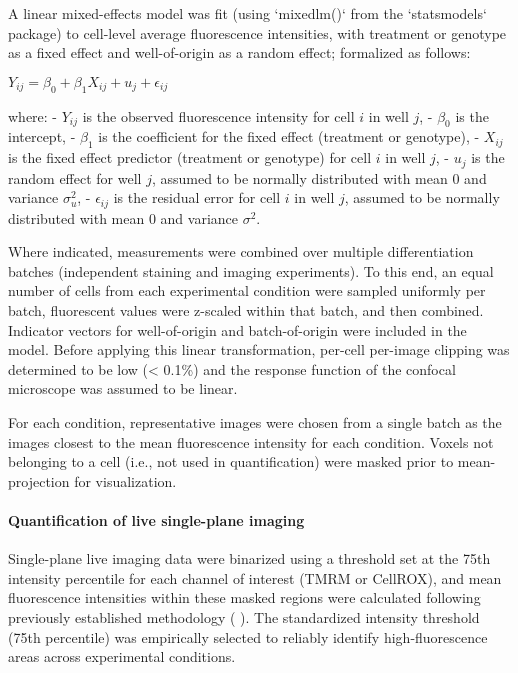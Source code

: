 A linear mixed-effects model was fit (using `mixedlm()` from the `statsmodels` package) to cell-level average fluorescence intensities, with treatment or genotype as a fixed effect and well-of-origin as a random effect; formalized as follows:

$ Y_{ij} = \beta_0 + \beta_1 X_{ij} + u_j + \epsilon_{ij} $

where:
- $Y_{ij}$ is the observed fluorescence intensity for cell $i$ in well $j$,
- $\beta_0$ is the intercept,
- $\beta_1$ is the coefficient for the fixed effect (treatment or genotype),
- $X_{ij}$ is the fixed effect predictor (treatment or genotype) for cell $i$ in well $j$,
- $u_j$ is the random effect for well $j$, assumed to be normally distributed with mean 0 and variance $\sigma_u^2$,
- $\epsilon_{ij}$ is the residual error for cell $i$ in well $j$, assumed to be normally distributed with mean 0 and variance $\sigma^2$.

Where indicated, measurements were combined over multiple differentiation batches (independent staining and imaging experiments). To this end, an equal number of cells from each experimental condition were sampled uniformly per batch, fluorescent values were z-scaled within that batch, and then combined. Indicator vectors for well-of-origin and batch-of-origin were included in the model. Before applying this linear transformation, per-cell per-image clipping was determined to be low (< 0.1\%) and the response function of the confocal microscope was assumed to be linear.

For each condition, representative images were chosen from a single batch as the images closest to the mean fluorescence intensity for each condition. Voxels not belonging to a cell (i.e., not used in quantification) were masked prior to mean-projection for visualization.

\paragraph{Quantification of live single-plane imaging}
Single-plane live imaging data were binarized using a threshold set at the 75th intensity percentile for each channel of interest (TMRM or CellROX), and mean fluorescence intensities within these masked regions were calculated following previously established methodology ( \cite{Esteras2020-md}). The standardized intensity threshold (75th percentile) was empirically selected to reliably identify high-fluorescence areas across experimental conditions.

